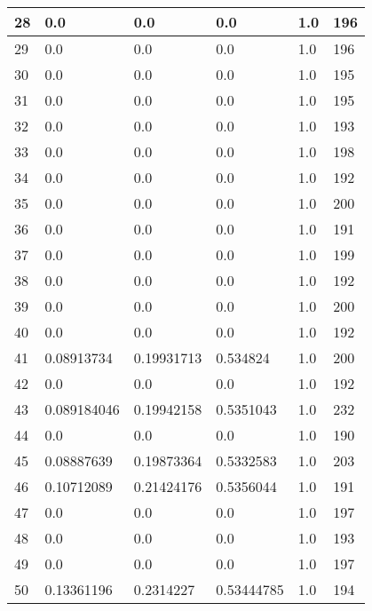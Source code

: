 \begin{longtable}{|l|l|l|l|l|l|}
28 & 0.0 & 0.0 & 0.0 & 1.0 & 196 \\ \hline 
29 & 0.0 & 0.0 & 0.0 & 1.0 & 196 \\ \hline 
30 & 0.0 & 0.0 & 0.0 & 1.0 & 195 \\ \hline 
31 & 0.0 & 0.0 & 0.0 & 1.0 & 195 \\ \hline 
32 & 0.0 & 0.0 & 0.0 & 1.0 & 193 \\ \hline 
33 & 0.0 & 0.0 & 0.0 & 1.0 & 198 \\ \hline 
34 & 0.0 & 0.0 & 0.0 & 1.0 & 192 \\ \hline 
35 & 0.0 & 0.0 & 0.0 & 1.0 & 200 \\ \hline 
36 & 0.0 & 0.0 & 0.0 & 1.0 & 191 \\ \hline 
37 & 0.0 & 0.0 & 0.0 & 1.0 & 199 \\ \hline 
38 & 0.0 & 0.0 & 0.0 & 1.0 & 192 \\ \hline 
39 & 0.0 & 0.0 & 0.0 & 1.0 & 200 \\ \hline 
40 & 0.0 & 0.0 & 0.0 & 1.0 & 192 \\ \hline 
41 & 0.08913734 & 0.19931713 & 0.534824 & 1.0 & 200 \\ \hline 
42 & 0.0 & 0.0 & 0.0 & 1.0 & 192 \\ \hline 
43 & 0.089184046 & 0.19942158 & 0.5351043 & 1.0 & 232 \\ \hline 
44 & 0.0 & 0.0 & 0.0 & 1.0 & 190 \\ \hline 
45 & 0.08887639 & 0.19873364 & 0.5332583 & 1.0 & 203 \\ \hline 
46 & 0.10712089 & 0.21424176 & 0.5356044 & 1.0 & 191 \\ \hline 
47 & 0.0 & 0.0 & 0.0 & 1.0 & 197 \\ \hline 
48 & 0.0 & 0.0 & 0.0 & 1.0 & 193 \\ \hline 
49 & 0.0 & 0.0 & 0.0 & 1.0 & 197 \\ \hline 
50 & 0.13361196 & 0.2314227 & 0.53444785 & 1.0 & 194 \\ \hline 
\end{longtable}